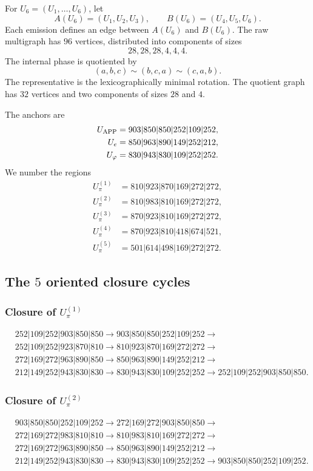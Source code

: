 For \(U_6=(U_1,\ldots,U_6)\), let
\[
 A(U_6)=(U_1,U_2,U_3),
 \qquad
 B(U_6)=(U_4,U_5,U_6).
\]
Each emission defines an edge between \(A(U_6)\) and \(B(U_6)\). The raw
multigraph has \(96\) vertices, distributed into components of sizes
\[
 28,28,28,4,4,4.
\]
The internal phase is quotiented by
\[
 (a,b,c)\sim(b,c,a)\sim(c,a,b).
\]
The representative is the lexicographically minimal rotation. The quotient
graph has \(32\) vertices and two components of sizes \(28\) and \(4\).

The anchors are
\[
\begin{aligned}
U_{\rm APP}&=903|850|850|252|109|252,\\
U_e&=850|963|890|149|252|212,\\
U_\varphi&=830|943|830|109|252|252.
\end{aligned}
\]
We number the regions
\[
\begin{aligned}
U_\pi^{(1)}&=810|923|870|169|272|272,\\
U_\pi^{(2)}&=810|983|810|169|272|272,\\
U_\pi^{(3)}&=870|923|810|169|272|272,\\
U_\pi^{(4)}&=870|923|810|418|674|521,\\
U_\pi^{(5)}&=501|614|498|169|272|272.
\end{aligned}
\]

\subsection{The \(5\) oriented closure cycles}

\subsubsection{Closure of \texorpdfstring{\(U_\pi^{(1)}\)}{U-pi 1}}
\begin{align*}
&252|109|252|903|850|850\to
903|850|850|252|109|252\to\\
&252|109|252|923|870|810\to
810|923|870|169|272|272\to\\
&272|169|272|963|890|850\to
850|963|890|149|252|212\to\\
&212|149|252|943|830|830\to
830|943|830|109|252|252\to
252|109|252|903|850|850.
\end{align*}

\subsubsection{Closure of \texorpdfstring{\(U_\pi^{(2)}\)}{U-pi 2}}
\begin{align*}
&903|850|850|252|109|252\to
272|169|272|903|850|850\to\\
&272|169|272|983|810|810\to
810|983|810|169|272|272\to\\
&272|169|272|963|890|850\to
850|963|890|149|252|212\to\\
&212|149|252|943|830|830\to
830|943|830|109|252|252\to
903|850|850|252|109|252.
\end{align*}

